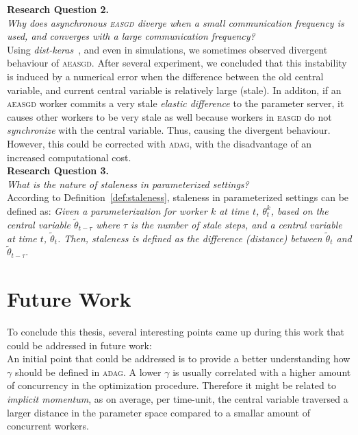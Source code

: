\noindent \textbf{Research Question 2.}\\
\emph{Why does asynchronous \textsc{easgd} diverge when a small communication frequency is used, and converges with a large communication frequency?}\\

Using \emph{dist-keras}~\cite{dist_keras}, and even in simulations, we sometimes observed divergent behaviour of \textsc{aeasgd}. After several experiment, we concluded that this instability is induced by a numerical error when the difference between the old central variable, and current central variable is relatively large (stale). In additon, if an \textsc{aeasgd} worker commits a very stale \emph{elastic difference} to the parameter server, it causes other workers to be very stale as well because workers in \textsc{easgd} do not \emph{synchronize} with the central variable. Thus, causing the divergent behaviour. However, this could be corrected with \textsc{adag}, with the disadvantage of an increased computational cost.\\

\noindent \textbf{Research Question 3.}\\
\emph{What is the nature of staleness in parameterized settings?}\\

According to Definition~\ref{def:staleness}, staleness in parameterized settings can be defined as: \emph{Given a parameterization for worker $k$ at time $t$, $\theta^k_t$, based on the central variable $\tilde{\theta}_{t - \tau}$ where $\tau$ is the number of stale steps, and a central variable at time $t$, $\tilde{\theta}_t$. Then, staleness is defined as the difference (distance) between $\tilde{\theta}_t$ and $\tilde{\theta}_{t-\tau}$}.

\section{Future Work}
\label{sec:conclusion_future_work}

To conclude this thesis, several interesting points came up during this work that could be addressed in future work:\\

An initial point that could be addressed is to provide a better understanding how $\gamma$ should be defined in \textsc{adag}. A lower $\gamma$ is usually correlated with a higher amount of concurrency in the optimization procedure. Therefore it might be related to \emph{implicit momentum}, as on average, per time-unit, the central variable traversed a larger distance in the parameter space compared to a smallar amount of concurrent workers.\\

